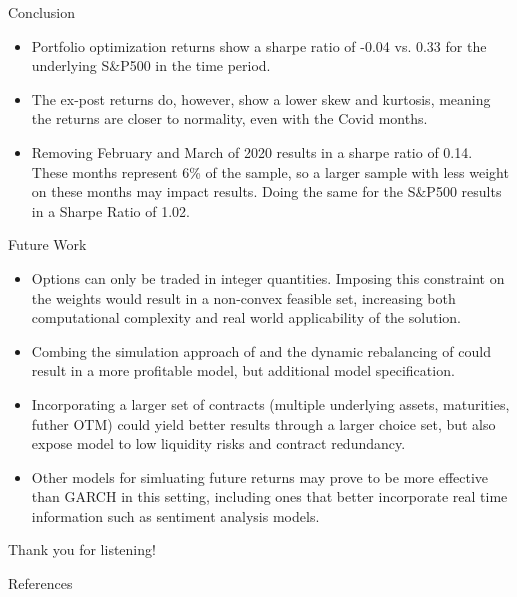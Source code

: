 \documentclass[9pt]{beamer}
\begin{document}
\begin{frame}{Conclusion}
    \begin{itemize}
        \item Portfolio optimization returns show a sharpe ratio of -0.04 vs. 0.33 for the underlying S\&P500 in the time period.
        \item The ex-post returns do, however, show a lower skew and kurtosis, meaning the returns are closer to normality, even with the Covid months.
        \item Removing February and March of 2020 results in a sharpe ratio of 0.14. These months represent 6\% of the sample, so a larger sample with less weight on these months may impact results. Doing the same for the S\&P500 results in a Sharpe Ratio of 1.02.
    \end{itemize}
\end{frame}

\begin{frame}{Future Work}
    \begin{itemize}
        \item Options can only be traded in integer quantities. Imposing this constraint on the weights would result in a non-convex feasible set, increasing both computational complexity and real world applicability of the solution.
        \item Combing the simulation approach of \cite{faias2017optimal} and the dynamic rebalancing of \cite{zhao2018markowitz} could result in a more profitable model, but additional model specification.
        \item Incorporating a larger set of contracts (multiple underlying assets, maturities, futher OTM) could yield better results through a larger choice set, but also expose model to low liquidity risks and contract redundancy.
        \item Other models for simluating future returns may prove to be more effective than GARCH in this setting, including ones that better incorporate real time information such as sentiment analysis models.
    \end{itemize}
\end{frame}

\begin{frame}
\begin{center}
\large{Thank you for listening!}
\end{center}
\end{frame}

\begin{frame}{References}
    
\end{frame}
\end{document}

